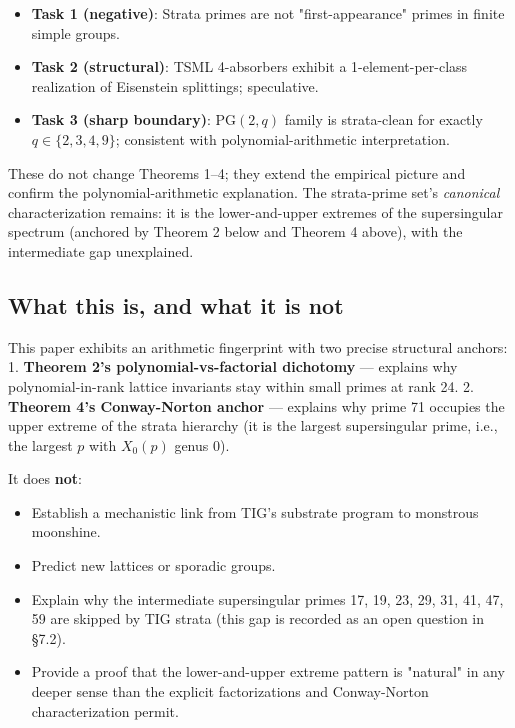 \documentclass[11pt,reqno]{amsart}
\theoremstyle{plain}
\theoremstyle{definition}
\begin{document}
\begin{itemize}
\item \textbf{Task 1 (negative)}: Strata primes are not "first-appearance" primes in finite simple groups.
\item \textbf{Task 2 (structural)}: TSML 4-absorbers exhibit a 1-element-per-class realization of Eisenstein splittings; speculative.
\item \textbf{Task 3 (sharp boundary)}: $\mathrm{PG}(2, q)$ family is strata-clean for exactly $q \in \{2, 3, 4, 9\}$; consistent with polynomial-arithmetic interpretation.
\end{itemize}

These do not change Theorems 1–4; they extend the empirical picture and confirm the polynomial-arithmetic explanation. The strata-prime set's \textit{canonical} characterization remains: it is the lower-and-upper extremes of the supersingular spectrum (anchored by Theorem 2 below and Theorem 4 above), with the intermediate gap unexplained.

\subsection{What this is, and what it is not}

This paper exhibits an arithmetic fingerprint with two precise structural anchors:
1. \textbf{Theorem 2's polynomial-vs-factorial dichotomy} --- explains why polynomial-in-rank lattice invariants stay within small primes at rank 24.
2. \textbf{Theorem 4's Conway-Norton anchor} --- explains why prime 71 occupies the upper extreme of the strata hierarchy (it is the largest supersingular prime, i.e., the largest $p$ with $X_0(p)$ genus 0).

It does \textbf{not}:
\begin{itemize}
\item Establish a mechanistic link from TIG's substrate program to monstrous moonshine.
\item Predict new lattices or sporadic groups.
\item Explain why the intermediate supersingular primes {17, 19, 23, 29, 31, 41, 47, 59} are skipped by TIG strata (this gap is recorded as an open question in §7.2).
\item Provide a proof that the lower-and-upper extreme pattern is "natural" in any deeper sense than the explicit factorizations and Conway-Norton characterization permit.
\end{itemize}
\end{document}
